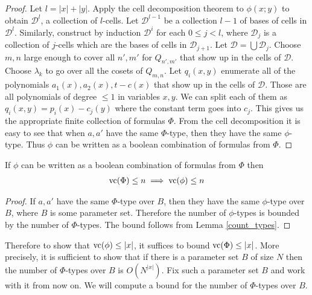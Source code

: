 \documentclass{amsart}
\newcommand{\DD}{\mathscr D}
\begin{document}
\begin{proof}
  Let $l = |x| + |y|$.
  Apply the cell decomposition theorem to $\phi(x; y)$ to obtain $\DD^l$, a collection of $l$-cells.
  Let $\DD^{l-1}$ be a collection $l-1$ of bases of cells in $\DD^l$.
  Similarly, construct by induction $\DD^i$ for each $0 \leq j < l$,
  where $\DD_j$ is a collection of $j$-cells which are the bases of cells in $\DD_{j+1}$.
  Let $\DD = \bigcup \DD_j$.
  Choose $m,n$ large enough to cover all $n', m'$ for $Q_{n',m'}$ that show up in the cells of $\DD$.
  Choose $\lambda_k$ to go over all the cosets of $Q_{m,n}$.
  Let $q_i(x, y)$ enumerate all of the polynomials $a_1(x), a_2(x), t - c(x)$ that show up in the cells of $\DD$.
  Those are all polynomials of degree $\leq 1$ in variables $x, y$.
  We can split each of them as $q_i(x,y) = p_i(x) - c_j(y)$ where the constant term goes into $c_j$.
  This gives us the appropriate finite collection of formulas $\Phi$.
  From the cell decomposition it is easy to see that when $a, a'$ have the same $\Phi$-type,
  then they have the same $\phi$-type.
  Thus $\phi$ can be written as a boolean combination of formulas from $\Phi$.
\end{proof}

\begin{Lemma}
  If $\phi$ can be written as a boolean combination of formulas from $\Phi$ then
  \begin{align*}
    \operatorname{vc} (\Phi) \leq n \implies \operatorname{vc} (\phi) \leq n
  \end{align*}
\end{Lemma}
\begin{proof}
  If $a,a'$ have the same $\Phi$-type over $B$, then they have the same $\phi$-type over $B$, where $B$ is some parameter set.
  Therefore the number of $\phi$-types is bounded by the number of $\Phi$-types.
  The bound follows from Lemma \ref{count_types}.
\end{proof}

Therefore to show that $\operatorname{vc}(\phi) \leq |x|$, it suffices to bound $\operatorname{vc}(\Phi) \leq |x|$.
More precisely, it is sufficient to show that if there is a parameter set $B$ of size $N$
then the number of $\Phi$-types over $B$ is $O(N^{|x|})$.
Fix such a parameter set $B$ and work with it from now on.
We will compute a bound for the number of $\Phi$-types over $B$.
\end{document}
